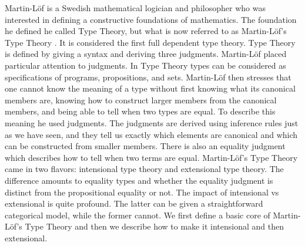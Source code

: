 Martin-L\"of is a Swedish mathematical logician and philosopher who
was interested in defining a constructive foundations of mathematics.
The foundation he defined he called Type Theory, but what is now
referred to as Martin-L\"of's Type Theory
\cite{Martin:1982,Martin:1984}.  It is considered the first full
dependent type theory.  Type Theory is defined by giving a syntax and
deriving three judgments.  Martin-L\"of placed particular attention
to judgments.  In Type Theory types can be considered as
specifications of programs, propositions, and sets.  Martin-L\"of then
stresses that one cannot know the meaning of a type without first
knowing what its canonical members are, knowing how to construct
larger members from the canonical members, and being able to tell when
two types are equal.  To describe this meaning he used judgments.  The
judgments are derived using inference rules just as we have seen, and
they tell us exactly which elements are canonical and which can be
constructed from smaller members.  There is also an equality judgment
which describes how to tell when two terms are equal.  Martin-L\"of's
Type Theory came in two flavors: intensional type theory and
extensional type theory.  The difference amounts to equality types and
whether the equality judgment is distinct from the propositional
equality or not.  The impact of intensional vs extensional is quite
profound.  The latter can be given a straightforward categorical
model, while the former cannot.  We first define a basic core of
Martin-L\"of's Type Theory and then we describe how to make it
intensional and then extensional.

